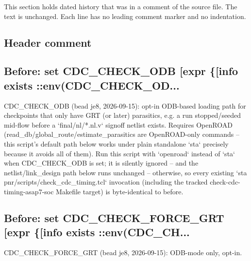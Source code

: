 This section holds dated history that was in a comment of the source file. The text is unchanged. Each line has no leading comment marker and no indentation.

\begin{record}

\subsection*{Header comment}


\subsection*{Before: set CDC\_CHECK\_ODB [expr \{[info exists ::env(CDC\_CHECK\_OD...}

\begin{textblock}
CDC_CHECK_ODB (bead je8, 2026-09-15): opt-in ODB-based loading path for
checkpoints that only have GRT (or later) parasitics, e.g. a run
stopped/seeded mid-flow before a `final/nl/*.nl.v` signoff netlist
exists. Requires OpenROAD (read_db/global_route/estimate_parasitics are
OpenROAD-only commands -- this script's default path below works under
plain standalone `sta` precisely because it avoids all of them). Run
this script with `openroad` instead of `sta` when CDC_CHECK_ODB is set;
it is silently ignored -- and the netlist/link_design path below runs
unchanged -- otherwise, so every existing `sta
pnr/scripts/check_cdc_timing.tcl` invocation (including the tracked
check-cdc-timing-asap7-soc Makefile target) is byte-identical to
before.
\end{textblock}

\subsection*{Before: set CDC\_CHECK\_FORCE\_GRT [expr \{[info exists ::env(CDC\_CH...}

\begin{textblock}
CDC_CHECK_FORCE_GRT (bead je8, 2026-09-15): ODB-mode only, opt-in.


\end{textblock}
\end{record}
